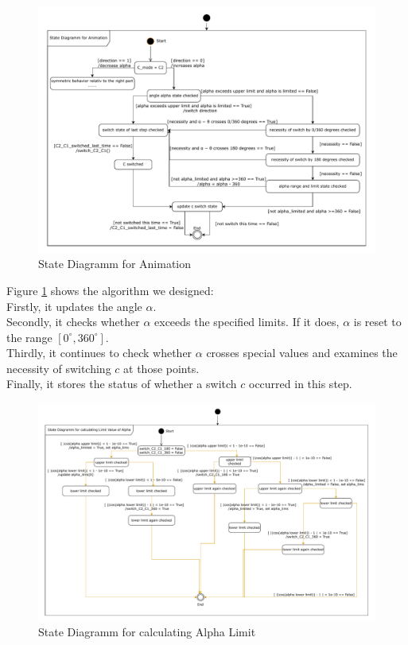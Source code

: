 \documentclass{article}
\begin{document}
\begin{itemize}
	\begin{figure}[h]
		\centering
		\includegraphics[width=\textwidth]{./figures/animation_state_diagramm_1.pdf}
		\caption{State Diagramm for Animation}
		\label{fig:state_diagramm_of_animation_alpha}
	\end{figure}

    Figure \ref{fig:state_diagramm_of_animation_alpha} shows the algorithm we designed:\\
    Firstly, it updates the angle \(\alpha\).\\
    Secondly, it checks whether \(\alpha\) exceeds the specified limits. If it does, \(\alpha\) is reset to the range \([0^\circ, 360^\circ]\).\\
    Thirdly, it continues to check whether \(\alpha\) crosses special values and examines the necessity of switching \(c\) at those points.\\
    Finally, it stores the status of whether a switch \(c\) occurred in this step.

	\begin{figure}[h]
		\centering
		\includegraphics[width=\textwidth]{./figures/state_diagramm_calculate_alpha_limit_1.pdf}
		\caption{State Diagramm for calculating Alpha Limit}
		\label{fig:state_diagramm_calculate_alpha_limit}
	\end{figure}


\end{itemize}
\end{document}
